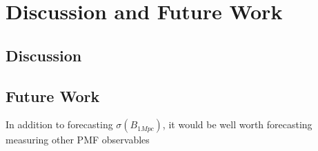 \section{Discussion and Future Work}
\subsection{Discussion}

\subsection{Future Work}

In addition to forecasting $\sigma(B_{1Mpc})$, it would be well worth forecasting measuring other PMF observables